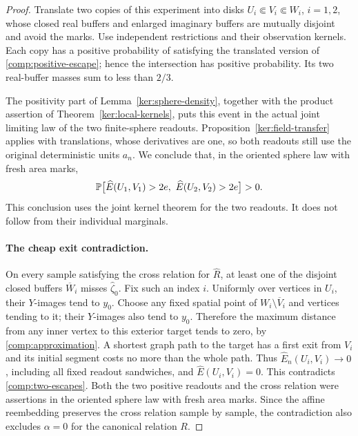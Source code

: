 \begin{proof}
Translate two copies of this experiment into disks
$U_i\Subset V_i\Subset W_i$, $i=1,2$, whose closed real buffers
and enlarged imaginary buffers are mutually disjoint and avoid
the marks.  Use independent restrictions and their observation
kernels.  Each copy has a positive probability of satisfying the
translated version of \eqref{comp:positive-escape}; hence the
intersection has positive probability.  Its two real-buffer
masses sum to less than $2/3$.

The positivity part of Lemma~\ref{ker:sphere-density}, together
with the product assertion of Theorem~\ref{ker:local-kernels},
puts this event in the actual joint limiting law of the two
finite-sphere readouts.  Proposition~\ref{ker:field-transfer} applies
with translations, whose derivatives are one, so both readouts
still use the original deterministic units $a_n$.  We conclude
that, in the oriented sphere law with fresh area marks,
\begin{equation}
 \label{comp:two-escapes}
 \PP\bigl[\widehat E(U_1,V_1)>2e,\
          \widehat E(U_2,V_2)>2e\bigr]>0.
\end{equation}
This conclusion uses the joint kernel theorem for the two
readouts.  It does not follow from their individual marginals.

\paragraph{The cheap exit contradiction.}
On every sample satisfying the cross relation for $\widehat R$,
at least one of the disjoint closed buffers $\overline W_i$
misses $\widehat\zeta_0$.  Fix
such an index $i$.  Uniformly over vertices in $U_i$, their
$Y$-images tend to $y_0$.  Choose any fixed spatial point of
$W_i\setminus\overline V_i$ and vertices tending to it; their
$Y$-images also tend to $y_0$.  Therefore the maximum distance
from any inner vertex to this exterior target tends to zero,
by \eqref{comp:approximation}.  A shortest graph path to the
target has a first exit from $V_i$ and its initial segment costs
no more than the whole path.  Thus
$\widehat E_n(U_i,V_i)\to0$, including all fixed readout sandwiches,
and $\widehat E(U_i,V_i)=0$.  This contradicts
\eqref{comp:two-escapes}.  Both the two positive readouts and the
cross relation were assertions in the oriented sphere law with
fresh area marks.  Since the affine reembedding preserves the
cross relation sample by sample, the contradiction also excludes
$\alpha=0$ for the canonical relation $R$.
\end{proof}


